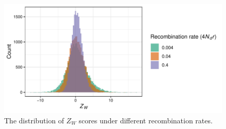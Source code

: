 \documentclass[10pt,twoside,lineno]{GSA_format}
\begin{document}
\begin{figure}
  \includegraphics[width=\textwidth]{Plots/recombinationRateHistogram.pdf} 
  \caption{The distribution of $Z_W$ scores under different recombination rates.}
  \label{fig:WZA_Recombination}
\end{figure}
\end{document}
